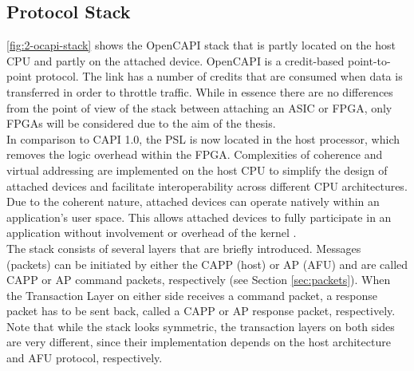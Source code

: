 \subsection{Protocol Stack}
\autoref{fig:2-ocapi-stack} shows the OpenCAPI stack that is partly located on the host CPU and partly on the attached device. OpenCAPI is a credit-based point-to-point protocol. The link has a number of credits that are consumed when data is transferred in order to throttle traffic. While in essence there are no differences from the point of view of the stack between attaching an ASIC or FPGA, only FPGAs will be considered due to the aim of the thesis.\\
In comparison to CAPI 1.0, the PSL is now located in the host processor, which removes the logic overhead within the FPGA. Complexities of coherence and virtual addressing are implemented on the host CPU to simplify the design of attached devices and facilitate interoperability across different CPU architectures. Due to the coherent nature, attached devices can operate natively within an application's user space. This allows attached devices to fully participate in an application without involvement or overhead of the kernel \cite{stuecheli-power9}.\\
The stack consists of several layers that are briefly introduced. Messages (packets) can be initiated by either the CAPP (host) or AP (AFU) and are called CAPP or AP command packets, respectively (see Section \ref{sec:packets}). When the Transaction Layer on either side receives a command packet, a response packet has to be sent back, called a CAPP or AP response packet, respectively. Note that while the stack looks symmetric, the transaction layers on both sides are very different, since their implementation depends on the host architecture and AFU protocol, respectively.

